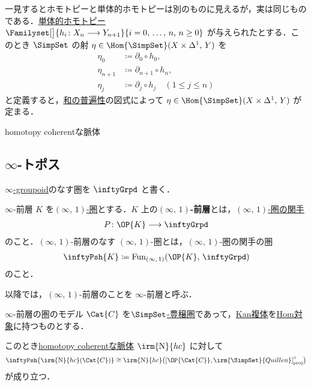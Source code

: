 \documentclass[TQFT_main]{subfiles}
\begin{document}
一見するとホモトピーと単体的ホモトピーは別のものに見えるが，実は同じものである．\hyperref[def:SimpSet-homotopy]{単体的ホモトピー} $\Familyset[\big]{h_i \colon X_n \lto Y_{n+1}}{i = 0,\, \dots,\, n,\, n \ge 0}$ が与えられたとする．このとき $\SimpSet$ の射 $\eta \in \Hom{\SimpSet}(X \times \Delta^1,\, Y)$ を
\begin{align}
    \eta_0 &\coloneqq \partial_0 \circ h_0, \\
    \eta_{n+1} &\coloneqq \partial_{n+1} \circ h_n, \\
    \eta_j &\coloneqq \partial_j \circ h_{j} \quad (1\le j \le n)
\end{align}
と定義すると，\hyperref[def:colim]{和の普遍性}の図式によって $\eta \in \Hom{\SimpSet}(X \times \Delta^1,\, Y)$ が定まる．


\begin{mydef}[label=def:nerve-hc]{homotopy coherentな脈体}
    
\end{mydef}


\subsection{$\infty$-トポス}

\hyperref[def:infinity-1]{$\infty$-groupoid}のなす圏を $\inftyGrpd$ と書く．

\begin{mydef}[label=def:infinity-presheaf]{$\infty$-前層}
    $K$ を\hyperref[def:infinity-1]{$(\infty,\, 1)$-圏}とする．$K$ 上の\textbf{$(\infty,\, 1)$-前層}とは，\hyperref[def:infinity-1]{$(\infty,\, 1)$-圏の関手}
    \begin{align}
        P \colon \OP{K} \lto \inftyGrpd
    \end{align}
    のこと．$(\infty,\, 1)$-前層のなす $(\infty,\, 1)$-圏とは，$(\infty,\, 1)$-圏の関手の圏
    \begin{align}
        \inftyPsh{K} \coloneqq \mathrm{Fun}_{(\infty,\, 1)} (\OP{K},\, \inftyGrpd)
    \end{align}
    のこと．
\end{mydef}

\begin{marker}
    以降では，$(\infty,\, 1)$-前層のことを $\infty$-前層と呼ぶ．
\end{marker}


\begin{myprop}[label=prop:nerve-Psh]{$\infty$-前層の圏のモデル}
    $\Cat{C}$ を\hyperref[def:enriched]{$\SimpSet$-豊穣圏}であって，\hyperref[def:KanCplx]{Kan複体}を\hyperref[def:enriched]{Hom対象}に持つものとする．
    
    このとき\hyperref[def:nerve-hc]{homotopy coherentな脈体} $\irm{\mathrm{N}}{hc}$ に対して
    \begin{align}
        \inftyPsh{\irm{\mathrm{N}}{hc}(\Cat{C})} \cong \irm{\mathrm{N}}{hc} \bigl( \comm{\OP{\Cat{C}}}{\irm{\SimpSet}{Quillen}}_{\mathrm{proj}}^\circ \bigr)
    \end{align}
    が成り立つ．
\end{myprop}
\end{document}
